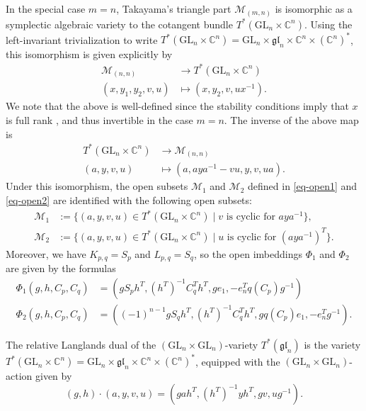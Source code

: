 \documentclass[11pt]{article}
\theoremstyle{definition}
\theoremstyle{plain}
\theoremstyle{remark}
\newcommand{\GL}{\mathrm{GL}}
\newcommand{\numberset}{\mathbb}
\newcommand{\C}{\numberset{C}}
\newcommand{\gl}{\mathfrak{gl}}
\begin{document}
        In the special case $m=n$, Takayama's triangle part $\mathcal{M}_{(m,n)}$ is isomorphic as a symplectic algebraic variety to the cotangent bundle $T^*(\GL_n \times \C^n)$. Using the left-invariant trivialization to write $T^*(\GL_n \times \C^n) = \GL_n \times \gl_n \times \C^n \times (\C^n)^*$, this isomorphism is given explicitly by
        \begin{align*}
            \mathcal{M}_{(n,n)} &\to T^*(\GL_n \times \C^n) \\
            (x,y_1,y_2,v,u) &\mapsto (x,y_2,v,ux^{-1}).
        \end{align*}
        We note that the above is well-defined since the stability conditions imply that $x$ is full rank \cite[Lemma 2.18]{Takayama2016}, and thus invertible in the case $m=n$. The inverse of the above map is        
        \begin{align*}
            T^*(\GL_n \times \C^n) &\to \mathcal{M}_{(n,n)} \\
            (a,y,v,u) &\mapsto (a, aya^{-1}-vu,y,v,ua).
        \end{align*}
        Under this isomorphism, the open subsets $\mathcal{M}_1$ and $\mathcal{M}_2$ defined in \eqref{eq-open1} and \eqref{eq-open2} are identified with the following open subsets:
        \begin{align*}
            \mathcal{M}_1 &:= \{ (a,y,v,u) \in T^*(\GL_n \times \C^n) \mid v \text{ is cyclic for } aya^{-1} \}, \\
            \mathcal{M}_2 &:= \{ (a,y,v,u) \in T^*(\GL_n \times \C^n) \mid u \text{ is cyclic for } (aya^{-1})^T \}.
        \end{align*}
        Moreover, we have $K_{p,q} = S_p$ and $L_{p,q} = S_q$, so the open imbeddings $\Phi_1$ and $\Phi_2$ are given by the formulas
        \begin{align}
            \Phi_1(g,h,C_p,C_q) &= (gS_ph^T,(h^T)^{-1}C_q^Th^T,ge_1,-e_n^Tq(C_p)g^{-1}) \label{eq-morphism1-RS} \\
            \Phi_2(g,h,C_p,C_q) &= ((-1)^{n-1}gS_q h^T,(h^T)^{-1}C_q^Th^T,gq(C_p)e_1,-e_n^Tg^{-1}). \label{eq-morphism2-RS}
        \end{align}

        \begin{corollary}\label{corollary-RS}
            The relative Langlands dual of the $(\GL_n \times \GL_n)$-variety $T^*(\gl_n)$ is the variety $T^*(\GL_n \times \C^n) = \GL_n \times \gl_n \times \C^n \times (\C^n)^*$, equipped with the $(\GL_n \times \GL_n)$-action given by
            \[
                (g,h) \cdot (a,y,v,u) = (gah^T, (h^T)^{-1}yh^T, gv, ug^{-1}).
            \]
        \end{corollary}
\end{document}
